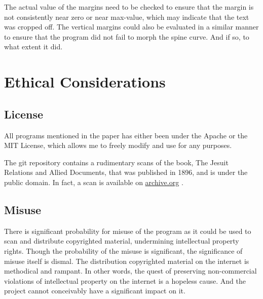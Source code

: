 \documentclass[10pt,twocolumn]{article}
\begin{document}

    

The actual value of the margins need to be checked to ensure that the margin is not consistently near zero or near max-value, which may indicate that the text was cropped off. The vertical margins could also be evaluated in a similar manner to ensure that the program did not fail to morph the spine curve. And if so, to what extent it did.\newline

\section{Ethical Considerations}
\subsection{License}
All programs mentioned in the paper has either been under the Apache or the MIT License, which allows me to freely modify and use for any purposes.\newline

The git repository contains a rudimentary scans of the book, The Jesuit Relations and Allied Documents, that was published in 1896, and is under the public domain. In fact, a scan is available on \url{archive.org} \cite{archive2009}.\newline

\subsection{Misuse}
There is significant probability for misuse of the program as it could be used to scan and distribute copyrighted material, undermining intellectual property rights. Though the probability of the misuse is significant, the significance of misuse itself is dismal. The distribution copyrighted material on the internet is methodical and rampant. In other words, the quest of preserving non-commercial violations of intellectual property on the internet is a hopeless cause. And the project cannot conceivably have a significant impact on it.\newline
\end{document}
